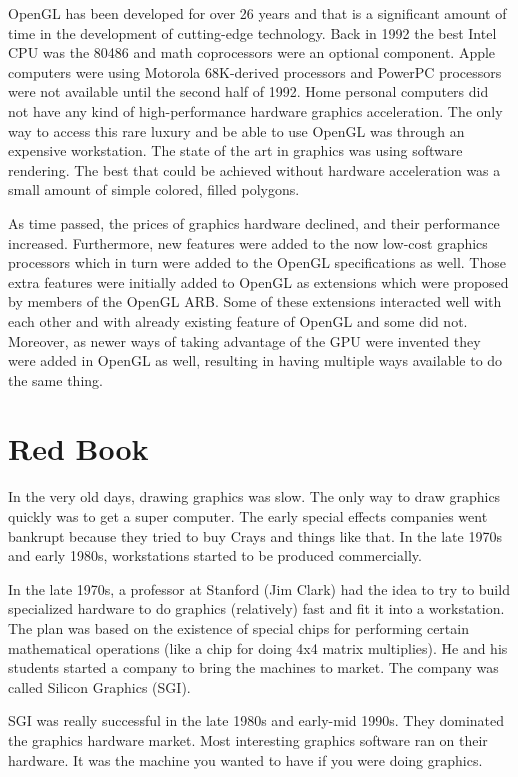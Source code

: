 OpenGL has been developed for over 26 years and that is a significant
amount of time in the development of cutting-edge technology.
Back in 1992 the best Intel CPU was the 80486 and math coprocessors
were an optional component. Apple computers were using Motorola
68K-derived processors and PowerPC processors were not available until
the second half of 1992. Home personal computers did not have any kind of
high-performance hardware graphics acceleration. The only way to access this
rare luxury and be able to use OpenGL was through an expensive workstation.
The state of the art in graphics was using software rendering. The best that
could be achieved without hardware acceleration was a small amount of simple
colored, filled polygons.

As time passed, the prices of graphics hardware declined, and their
performance increased. Furthermore, new features were added to the now
low-cost graphics processors which in turn were added to the OpenGL specifications
as well. Those extra features were initially added to OpenGL as extensions
which were proposed by members of the OpenGL ARB. Some of these extensions
interacted well with each other and with already existing feature of OpenGL
and some did not. Moreover, as newer ways of taking advantage of the GPU were
invented they were added in OpenGL as well, resulting in having multiple ways
available to do the same thing.

\section{Red Book}

In the very old days, drawing graphics was slow. The only way to draw graphics
quickly was to get a super computer. The early special effects companies
went bankrupt because they tried to buy Crays and things like that.
In the late 1970s and early 1980s, workstations started to be produced
commercially.

In the late 1970s, a professor at Stanford (Jim Clark) had the idea to
try to build specialized hardware to do graphics (relatively) fast and fit
it into a workstation. The plan was based on the existence of special chips
for performing certain mathematical operations (like a chip for doing 4x4
matrix multiplies). He and his students started a company to bring the
machines to market. The company was called Silicon Graphics (SGI).

SGI was really successful in the late 1980s and early-mid 1990s.
They dominated the graphics hardware market. Most interesting graphics software
ran on their hardware. It was the machine you wanted to have if you were doing
graphics.


